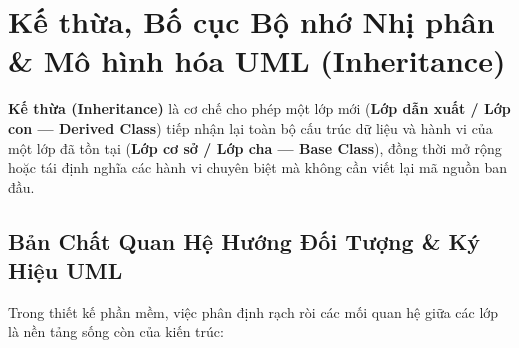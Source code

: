 \documentclass[12pt,a4paper,oneside]{book}
\begin{document}
\chapter{Kế thừa, Bố cục Bộ nhớ Nhị phân \& Mô hình hóa UML (Inheritance)}

\begin{theorybox}
\textbf{Kế thừa (Inheritance)} là cơ chế cho phép một lớp mới (\textbf{Lớp dẫn xuất / Lớp con --- Derived Class}) tiếp nhận lại toàn bộ cấu trúc dữ liệu và hành vi của một lớp đã tồn tại (\textbf{Lớp cơ sở / Lớp cha --- Base Class}), đồng thời mở rộng hoặc tái định nghĩa các hành vi chuyên biệt mà không cần viết lại mã nguồn ban đầu.
\end{theorybox}

\section{Bản Chất Quan Hệ Hướng Đối Tượng \& Ký Hiệu UML}

Trong thiết kế phần mềm, việc phân định rạch ròi các mối quan hệ giữa các lớp là nền tảng sống còn của kiến trúc:
\end{document}
